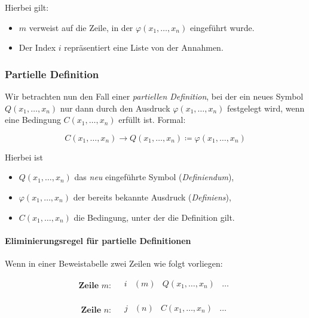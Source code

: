 \documentclass[main.tex]{subfiles}
\begin{document}
Hierbei gilt:
\begin{itemize}
    \item \(m\) verweist auf die Zeile, in der \(\varphi(x_1,\dots,x_n)\) eingeführt wurde.
    \item Der Index \(i\) repräsentiert eine Liste von der Annahmen.
\end{itemize}

\subsubsection{Partielle Definition}
Wir betrachten nun den Fall einer \emph{partiellen Definition}, bei der ein neues Symbol \(Q(x_1,\dots,x_n)\) nur dann durch den Ausdruck \(\varphi(x_1,\dots,x_n)\) festgelegt wird, wenn eine Bedingung \(C(x_1,\dots,x_n)\) erfüllt ist. Formal:

\begin{definition}[\(Q\) (partiell)]
\label{CLpxSubOnewDotswxSubnRpToQLpxSubOnewDotswxSubnRpDefEqVarphiLpxSubOnewDotswxSubnRp}
\[
C(x_1,\dots,x_n)\rightarrow Q(x_1,\dots,x_n) \coloneqq \varphi(x_1,\dots,x_n)
\]
\end{definition}

Hierbei ist 
\begin{itemize}
    \item \(Q(x_1,\dots,x_n)\) das \emph{neu} eingeführte Symbol (\emph{Definiendum}), 
    \item \(\varphi(x_1,\dots,x_n)\) der bereits bekannte Ausdruck (\emph{Definiens}),
    \item \(C(x_1,\dots,x_n)\) die Bedingung, unter der die Definition gilt.
\end{itemize}

\paragraph{Eliminierungsregel für partielle Definitionen}
Wenn in einer Beweistabelle zwei Zeilen wie folgt vorliegen:

\[
\textbf{Zeile }m: 
\quad
\begin{array}{llll}
   i & (m) & Q(x_1,\dots,x_n) & \dots \\
\end{array}
\]

\[
\textbf{Zeile }n:
\quad
\begin{array}{llll}
   j & (n) & C(x_1,\dots,x_n) & \dots \\
\end{array}
\]
\end{document}
